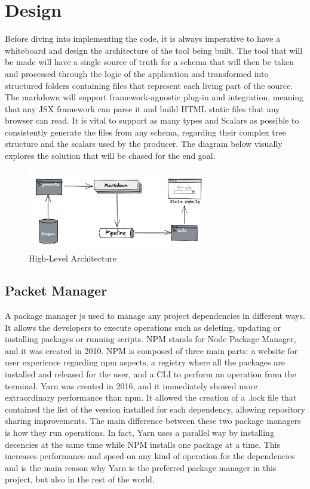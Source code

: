 \section{Design}
\label{s:ch5-Design}
Before diving into implementing the code, it is always imperative to have a
whiteboard and design the architecture of the tool being built. The tool that
will be made will have a single source of truth for a schema that will then be
taken and processed through the logic of the application and transformed into
structured folders containing files that represent each living part of the
source. The markdown will support framework-agnostic plug-in and integration,
meaning that any JSX framework can parse it and build HTML static files that any
browser can read. It is vital to support as many types and Scalars as possible
to consistently generate the files from any schema, regarding their complex tree
structure and the scalars used by the producer. The diagram below visually
explores the solution that will be chased for the end goal.

\begin{figure}[H]
  \centering
  \includegraphics[width=0.7\textwidth]{figures/architecture}
  \caption{High-Level Architecture}
  \label{f:ch5-architecture}
\end{figure}

\subsection{Packet Manager}
\label{ss:Packet-Manager}

A package manager js used to manage any project dependencies in different ways.
It allows the developers to execute operations such as deleting, updating or
installing packages or running scripts. NPM stands for Node Package Manager, and
it was created in 2010. NPM is composed of three main parts: a website for user
experience regarding npm aspects, a registry where all the packages are
installed and released for the user, and a CLI to perform an operation from the
terminal. Yarn was created in 2016, and it immediately showed more extraordinary
performance than npm. It allowed the creation of a .lock file that contained the
list of the version installed for each dependency, allowing repository sharing
improvements. The main difference between these two package managers is how they
run operations. In fact, Yarn uses a parallel way by installing decencies at the
same time while NPM installs one package at a time. This increases performance
and speed on any kind of operation for the dependencies and is the main reason
why Yarn is the preferred package manager in this project, but also in the rest
of the world.

